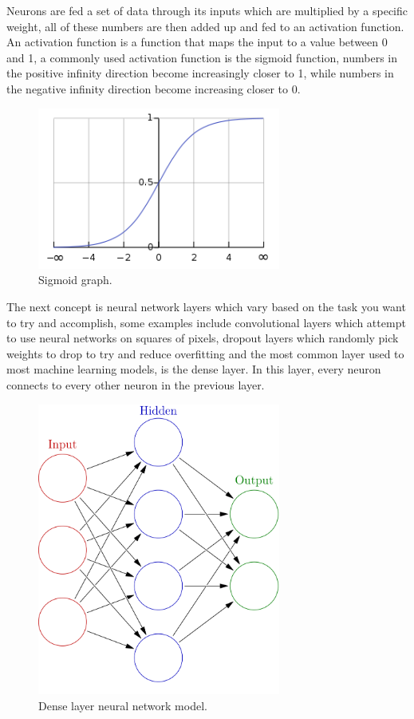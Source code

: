 \documentclass[a4paper,oneside,phd,etd]{BYUPhys}
\begin{document}
Neurons are fed a set of data through its inputs which are multiplied by a specific weight, all of these numbers are then added up and fed to an activation function. An activation function is a function that maps the input to a value between 0 and 1, a commonly used activation function is the sigmoid function, numbers in the positive infinity direction become increasingly closer to 1, while numbers in the negative infinity direction become increasing closer to 0.
\begin{figure}[H]
\centering
\includegraphics[width=8cm]{pictures/sigmoid.png}
\caption{Sigmoid graph\cite{fig:sigmoid}.}
\label{fig:sigmoid}
\end{figure}

The next concept is neural network layers which vary based on the task you want to try and accomplish, some examples include convolutional layers which attempt to use neural networks on squares of pixels, dropout layers which randomly pick weights to drop to try and reduce overfitting and the most common layer used to most machine learning models, is the dense layer. In this layer, every neuron connects to every other neuron in the previous layer.
\begin{figure}[H]
\centering
\includegraphics[width=8cm]{pictures/neural_network_model.png}
\caption{Dense layer neural network model\cite{fig:neural_network_model}.}
\label{fig:neural_network_model}
\end{figure}
\end{document}
